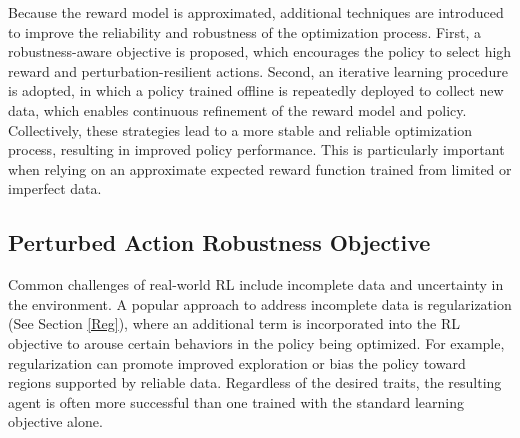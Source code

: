 \documentclass[./dissertation.tex]{subfiles}
\begin{document}
Because the reward model is approximated, additional techniques are introduced to improve the reliability and robustness of the optimization process. First, a robustness-aware objective is proposed, which encourages the policy to select high reward and perturbation-resilient actions. Second, an iterative learning procedure is adopted, in which a policy trained offline is repeatedly deployed to collect new data, which enables continuous refinement of the reward model and policy. Collectively, these strategies lead to a more stable and reliable optimization process, resulting in improved policy performance. This is particularly important when relying on an approximate expected reward function trained from limited or imperfect data.

\subsection{Perturbed Action Robustness Objective}

Common challenges of real-world RL include incomplete data and uncertainty in the environment. A popular approach to address incomplete data is regularization (See Section \ref{Reg}), where an additional term is incorporated into the RL objective to arouse certain behaviors in the policy being optimized. For example, regularization can promote improved exploration or bias the policy toward regions supported by reliable data. Regardless of the desired traits, the resulting agent is often more successful than one trained with the standard learning objective alone.

\end{document}
